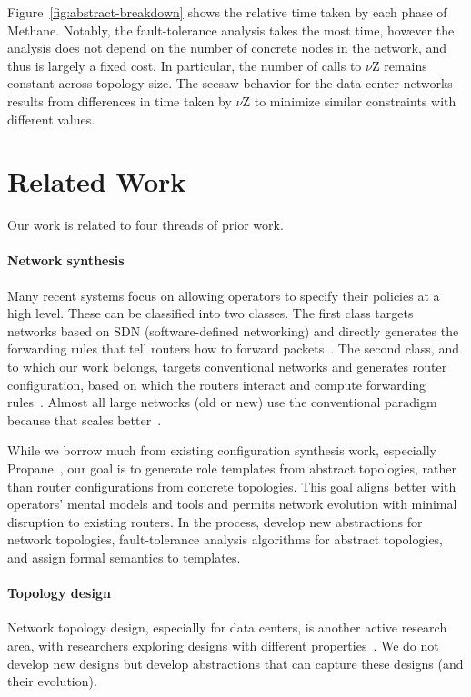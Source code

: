 \documentclass[numbers, 10pt, preprint]{sigplanconf}
\newcommand{\sysname}{{\small \sf Methane}\xspace}
\newcommand{\para}[1]{\paragraph*{\textbf{#1}}}
\begin{document}
Figure~\ref{fig:abstract-breakdown} shows the relative time taken by each phase of \sysname. Notably, the fault-tolerance analysis takes the most time, however the analysis does not depend on the number of concrete nodes in the network, and thus is largely a fixed cost. In particular, the number of calls to $\nu$Z remains constant across topology size. The seesaw behavior for the data center networks results from differences in time taken by $\nu$Z to minimize similar constraints with different values.




%
%
%
%

\section{Related Work}
\label{sec:related}

Our work is related to four threads of prior work.

\para{Network synthesis} Many recent systems focus on allowing operators to specify their policies at a high level. These can be classified into two classes. The first class targets networks based on SDN (software-defined networking) and directly generates the forwarding rules that tell routers how to forward packets~\cite{foster:merlin,fattire,netgen}. The second class, and to which our work belongs, targets conventional networks and generates router configuration, based on which the routers interact and compute forwarding rules~\cite{propane,narain:lisa05,narain+:configassure}.
Almost all large networks (old or new) use the conventional paradigm because that scales better~\cite{bgp-in-dc}.

While we borrow much from existing configuration synthesis work, especially Propane~\cite{propane}, our goal is to generate role templates from abstract topologies, rather than router configurations from concrete topologies.
This goal aligns better with operators' mental models and tools and permits network evolution with minimal disruption to existing routers. In the process, develop new abstractions for network topologies, fault-tolerance analysis algorithms for abstract topologies, and assign formal semantics to templates.

\para{Topology design} Network topology design, especially for data centers, is another active research area, with researchers exploring designs with different properties~\cite{fattree,facebook-fattree,f10-fattree,vl2-fattree,bcube,dcell,hyperx,butterfly}.  We do not develop new designs but develop abstractions that can capture these designs (and their evolution).
\end{document}
